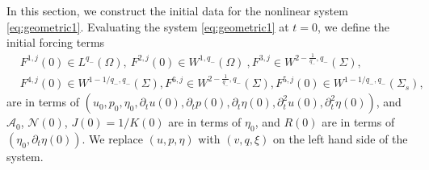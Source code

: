 \documentclass[letterpaper,reqno,10pt,twoside]{amsart}
\theoremstyle{definition}
\theoremstyle{remark}
\def\p{\partial}
\def\Om{\Omega}
\begin{document}
\begin{appendix}
			In this section, we construct the initial data for the nonlinear system \eqref{eq:geometric1}. Evaluating the system \eqref{eq:geometric1} at $t=0$, we define the initial forcing terms
			\begin{equation}\label{initial_dt2xi}
				\begin{aligned}
					&F^{1,j}(0)\in L^{q_-}(\Om),\ F^{2,j}(0)\in W^{1,q_{-}}(\Om)\ , F^{3,j}\in W^{2-\frac{1}{q_{-}},q_{-}}(\Sigma), \\
					&F^{4,j}(0)\in W^{1-1/q_-,q_-}(\Sigma), F^{6,j}\in W^{2-\frac{1}{q_{-}},q_{-}}(\Sigma), F^{5,j}(0)\in W^{1-1/q_-,q_-}(\Sigma_s),
				\end{aligned}
			\end{equation}
			are in terms of $(u_0, p_0,\eta_0, \p_tu(0), \p_tp(0), \p_t\eta(0),\p_{t}^{2}u(0),\p_{t}^{2}\eta(0))$, and $\mathcal{A}_0$, $\mathcal{N}(0)$, $J(0)=1/K(0)$ are in terms of $\eta_0$, and $R(0)$ are in terms of $(\eta_0, \p_t\eta(0))$.  We replace $(u,p,\eta)$ with $(v,q,\xi)$ on the left hand side of the system. 
			

\end{appendix}
\end{document}
